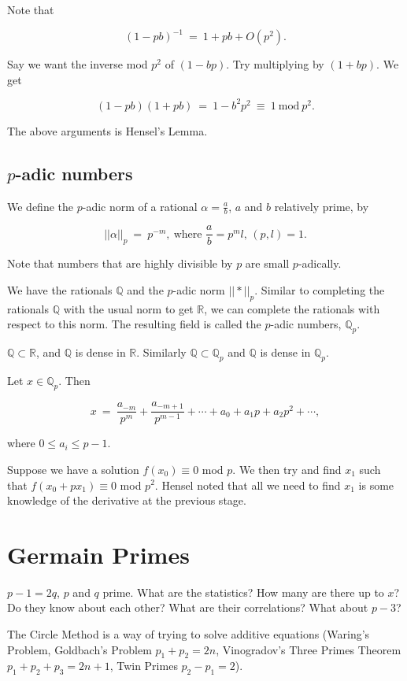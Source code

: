 \documentclass[12pt,letterpaper]{report}
\newcommand\be{\begin{equation}}
\newcommand\ee{\end{equation}}
\newcommand{\R}{\ensuremath{\mathbb{R}}}
\newcommand{\Q}{\mathbb{Q}}
\begin{document}
Note that

\be (1-pb)^{-1} \ = \ 1 + pb + O(p^2). \ee

Say we want the inverse mod $p^2$ of $(1-bp)$. Try multiplying by
$(1+bp)$. We get

\be (1-pb)(1+pb) \ = \ 1 - b^2 p^2 \ \equiv \ 1 \ \text{mod} \
p^2. \ee

The above arguments is Hensel's Lemma.

\subsection{$p$-adic numbers}

We define the $p$-adic norm of a rational $\alpha = \frac{a}{b}$,
$a$ and $b$ relatively prime, by

\be ||\alpha||_p \ = \ p^{-m}, \ \text{where $\frac{a}{b} = p^m
l$, $(p,l) = 1$}. \ee

Note that numbers that are highly divisible by $p$ are small
$p$-adically.

We have the rationals $\Q$ and the $p$-adic norm $|| \ast ||_p$.
Similar to completing the rationals $\Q$ with the usual norm to
get $\R$, we can complete the rationals with respect to this norm.
The resulting field is called the $p$-adic numbers, $\Q_p$.

$\Q \subset \R$, and $\Q$ is dense in $\R$. Similarly $\Q \subset
\Q_p$ and $\Q$ is dense in $\Q_p$.

Let $x \in \Q_p$. Then

\be x \ = \ \frac{a_{-m}}{p^m} + \frac{a_{-m+1}}{p^{m-1}} + \cdots
+ a_0 + a_1 p + a_2 p^2 + \cdots, \ee

where $0 \le a_i \le p - 1$.

Suppose we have a solution $f(x_0) \equiv 0$ mod $p$. We then try
and find $x_1$ such that $f(x_0 + px_1) \equiv 0$ mod $p^2$.
Hensel noted that all we need to find $x_1$ is some knowledge of
the derivative at the previous stage.




\section{Germain Primes}

$p-1 = 2q$, $p$ and $q$ prime. What are the statistics? How many
are there up to $x$? Do they know about each other? What are their
correlations? What about $p - 3$?

The Circle Method is a way of trying to solve additive equations
(Waring's Problem, Goldbach's Problem $p_1 + p_2 = 2n$,
Vinogradov's Three Primes Theorem $p_1 + p_2 + p_3 = 2n+1$, Twin
Primes $p_2 - p_1 = 2$).
\end{document}
